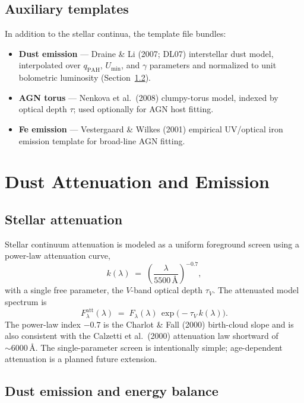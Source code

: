 \documentclass[12pt]{article}
\newcommand{\tauv}{\tau_{V}}
\newcommand{\klam}{k(\lambda)}
\newcommand{\Flam}{F_\lambda}
\begin{document}
\subsection{Auxiliary templates}
\label{ssec:aux}

In addition to the stellar continua, the template file bundles:
\begin{itemize}
  \item \textbf{Dust emission} — Draine \& Li (2007; DL07) interstellar
    dust model, interpolated over $q_\mathrm{PAH}$, $U_\mathrm{min}$, and
    $\gamma$ parameters and normalized to unit bolometric luminosity
    (Section~\ref{ssec:dustem}).
  \item \textbf{AGN torus} — Nenkova et al.\ (2008) clumpy-torus model,
    indexed by optical depth $\tau$; used optionally for AGN host fitting.
  \item \textbf{Fe emission} — Vestergaard \& Wilkes (2001) empirical
    UV/optical iron emission template for broad-line AGN fitting.
\end{itemize}


\section{Dust Attenuation and Emission}
\label{sec:dust}

\subsection{Stellar attenuation}
\label{ssec:atten}

Stellar continuum attenuation is modeled as a uniform foreground screen
using a power-law attenuation curve,
\begin{equation}
  \klam \;=\; \left(\frac{\lambda}{5500\,\text{\AA}}\right)^{-0.7},
  \label{eq:klam}
\end{equation}
with a single free parameter, the $V$-band optical depth $\tauv$.  The
attenuated model spectrum is
\begin{equation}
  \Flam^{\mathrm{att}}(\lambda)
  \;=\; \Flam(\lambda)\,\exp\!\bigl(-\tauv\,\klam\bigr).
  \label{eq:atten}
\end{equation}
The power-law index $-0.7$ is the Charlot \& Fall (2000) birth-cloud slope
and is also consistent with the Calzetti et al.\ (2000) attenuation law
shortward of $\sim6000$\,\AA.  The single-parameter screen is intentionally
simple; age-dependent attenuation is a planned future extension.

\subsection{Dust emission and energy balance}
\label{ssec:dustem}
\end{document}
